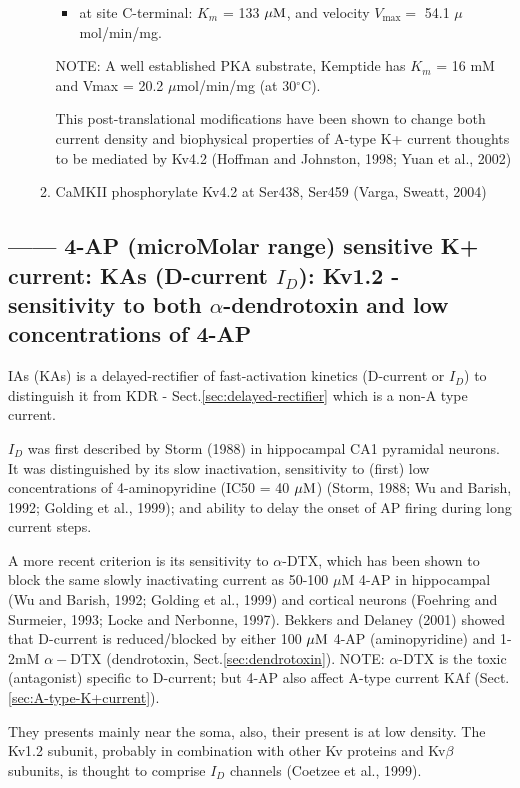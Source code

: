 \begin{itemize}
\begin{enumerate}
\begin{itemize}
  \item at site C-terminal: $K_m$ = 133 ${\mu\text{M}}$, and velocity $V_\max = $ 54.1
  $\mu$mol/min/mg.
\end{itemize}
NOTE: A well established PKA substrate, Kemptide has $K_m$ = 16 mM and Vmax
= 20.2 $\mu$mol/min/mg (at 30$^\circ$C).


This post-translational modifications have been shown to change both current
density and biophysical properties of A-type K+ current thoughts to be mediated
by Kv4.2 (Hoffman and Johnston, 1998; Yuan et al., 2002)

  \item CaMKII phosphorylate Kv4.2 at Ser438, Ser459 (Varga, Sweatt, 2004) 
\end{enumerate} 

\end{itemize}


\subsection{------  4-AP (microMolar range) sensitive K+ current: KAs
(D-current $I_D$): Kv1.2 - sensitivity to both $\alpha$-dendrotoxin
and low concentrations of 4-AP}
\label{sec:K+current_4-AP-sensitive-KAs}
\label{sec:KAs-current}
\label{sec:D-type-K+-current}

IAs (KAs) is a delayed-rectifier of fast-activation kinetics (D-current or
$I_D$) to distinguish it from KDR - Sect.\ref{sec:delayed-rectifier} which is a
non-A type current. 

\begin{mdframed}

$I_D$ was first described by Storm (1988) in hippocampal CA1 pyramidal neurons.
It was distinguished by its slow inactivation, sensitivity to (first) low
concentrations of 4-aminopyridine (IC50 = 40 ${\mu\text{M}}$) (Storm, 1988; Wu and
Barish, 1992; Golding et al., 1999); and ability to delay the onset of AP firing
during long current steps.

A more recent criterion is its sensitivity to $\alpha$-DTX, which has been shown
to block the same slowly inactivating current as 50-100 $\mu$M 4-AP in
hippocampal (Wu and Barish, 1992; Golding et al., 1999) and cortical neurons
(Foehring and Surmeier, 1993; Locke and Nerbonne, 1997).
Bekkers and Delaney (2001) showed that D-current is reduced/blocked by either
100 ${\mu\text{M}}$ 4-AP (aminopyridine) and 1-2mM $\alpha-$DTX (dendrotoxin,
Sect.\ref{sec:dendrotoxin}).
NOTE: $\alpha$-DTX is the toxic (antagonist) specific to D-current; but 4-AP
also affect A-type current KAf (Sect.\ref{sec:A-type-K+current}).

They presents mainly near the soma, also, their present is at low density.
The Kv1.2 subunit, probably in combination with other Kv proteins and Kv$\beta$
subunits, is thought to comprise $I_D$ channels (Coetzee et al., 1999).

\end{mdframed}

